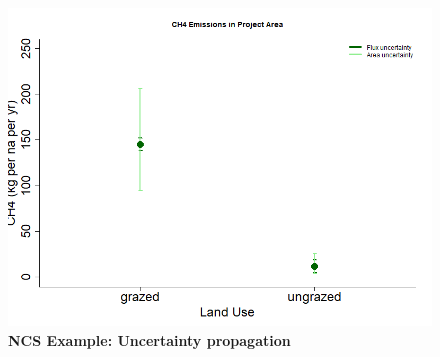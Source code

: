\documentclass{article}
\begin{document}
 \begin{figure}[h]
\centering
 \includegraphics{../figs/ncs/ncsprojimpactch4.png}
 \caption{\textbf{NCS Example: Uncertainty propagation}} 
 \label{fig:ncs}
 \end{figure}
 
 

\end{document}
